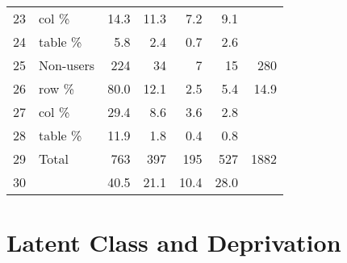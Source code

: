 \documentclass{article}
\begin{document}
\begin{table}[ht]
\begin{tabular}{llrrrrr}
  23 & col \% & 14.3 & 11.3 & 7.2 & 9.1 &  \\ 
  24 & table \% & 5.8 & 2.4 & 0.7 & 2.6 &  \\ 
  25 & Non-users & 224 & 34 & 7 & 15 & 280 \\ 
  26 & row \% & 80.0 & 12.1 & 2.5 & 5.4 & 14.9 \\ 
  27 & col \% & 29.4 & 8.6 & 3.6 & 2.8 &  \\ 
  28 & table \% & 11.9 & 1.8 & 0.4 & 0.8 &  \\ 
  29 & Total & 763 & 397 & 195 & 527 & 1882 \\ 
  30 &  & 40.5 & 21.1 & 10.4 & 28.0 &  \\ 
   \hline
\end{tabular}
\end{table}

\section{Latent Class and Deprivation}
\end{document}
